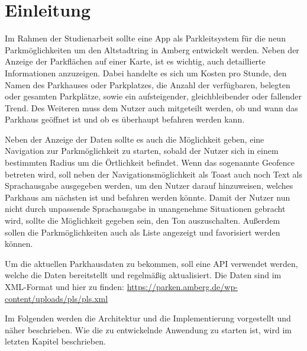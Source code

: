 \chapter{Einleitung}

Im Rahmen der Studienarbeit sollte eine App als Parkleitsystem für die neun Parkmöglichkeiten um den Altstadtring in Amberg entwickelt werden. Neben der Anzeige der Parkflächen auf einer Karte, ist es wichtig, auch detaillierte Informationen anzuzeigen. Dabei handelte es sich um Kosten pro Stunde, den Namen des Parkhauses oder Parkplatzes, die Anzahl der verfügbaren, belegten oder gesamten Parkplätze, sowie ein aufsteigender, gleichbleibender oder fallender Trend. Des Weiteren muss dem Nutzer auch mitgeteilt werden, ob und wann das Parkhaus geöffnet ist und ob es überhaupt befahren werden kann.

Neben der Anzeige der Daten sollte es auch die Möglichkeit geben, eine Navigation zur Parkmöglichkeit zu starten, sobald der Nutzer sich in einem bestimmten Radius um die Örtlichkeit befindet. Wenn das sogenannte Geofence betreten wird, soll neben der Navigationsmöglichkeit als Toast auch noch Text als Sprachausgabe ausgegeben werden, um den Nutzer darauf hinzuweisen, welches Parkhaus am nächsten ist und befahren werden könnte. Damit der Nutzer nun nicht durch unpassende Sprachausgabe in unangenehme Situationen gebracht wird, sollte die Möglichkeit gegeben sein, den Ton auszuschalten. Außerdem sollen die Parkmöglichkeiten auch als Liste angezeigt und favorisiert werden können.

Um die aktuellen Parkhausdaten zu bekommen, soll eine API verwendet werden, welche die Daten bereitstellt und regelmäßig aktualisiert. Die Daten sind im XML-Format und hier zu finden: \url{https://parken.amberg.de/wp-content/uploads/pls/pls.xml}

Im Folgenden werden die Architektur und die Implementierung vorgestellt und näher beschrieben. Wie die zu entwickelnde Anwendung zu starten ist, wird im letzten Kapitel beschrieben.